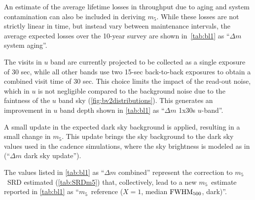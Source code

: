 \documentclass[PST,authoryear,toc]{lsstdoc}
\newcommand{\cm}{\ensuremath{C_m}}
\newcommand{\mf}{\ensuremath{m_5}}
\begin{document}
An estimate of the average lifetime losses in throughput due to aging and system contamination can also be included in deriving \mf. While these losses are not strictly linear in time, but instead vary between maintenance intervals, the average expected losses over the 10-year survey are shown in~\autoref{tab:bl1}  as ``$\Delta m$ system aging''.



The visits in $u$ band are currently projected to be collected as a single exposure of 30 sec, while all other bands use two 15-sec back-to-back exposures to obtain a combined visit time of 30 sec. This choice limits the impact of the read-out noise, which in $u$ is not negligible compared to the background noise due to the faintness of the $u$ band sky (\autoref{fig:bv2distributions}). %
This generates an improvement in $u$ band depth  shown in \autoref{tab:bl1} as  ``$\Delta m$ 1x30s $u$-band''.

A small update in the expected dark sky background is applied, resulting in a small change in \mf. This update brings the sky background to the dark sky values used in the cadence simulations, where the sky brightness is modeled as in \href{https://www.osti.gov/biblio/1784946}{{\citet{osti_1784946}}} (``$\Delta m$ dark sky update'').

The values listed in \autoref{tab:bl1} as ``$\Delta m$ combined'' represent the correction to \mf \ SRD estimated (\autoref{tab:SRDm5}) that, collectively, lead to a new \mf\ estimate reported in \autoref{tab:bl1} as ``\mf\ reference ($X=1$, median ${\rm FWHM}_{500}$, dark)''.


\FloatBarrier
\end{document}
